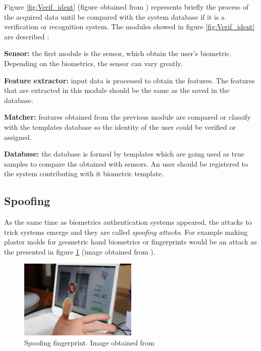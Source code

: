 Figure \ref{fig:Verif_ident} (figure obtained from \cite{Intro_biometrics2}) represents briefly the process of the acquired data until be compared  with the system database if it is a verification or recognition system. The modules showed in figure \ref{fig:Verif_ident} are described \cite{Intro_biometrics2}: 
\begin{description}[noitemsep,topsep=8pt,parsep=0pt,partopsep=20pt]
\item \textbf{Sensor:} the first module is the sensor, which obtain the user's biometric. Depending on the biometrics, the sensor can vary greatly.
\item \textbf{Feature extractor:} input data is processed to obtain the features. The features that are extracted in this module should be the same as the saved in the database.
\item \textbf{Matcher:} features obtained from the previous module are compared or classify with the templates database so the identity of the user could be verified or assigned.
\item \textbf{Database:} the database is formed by templates which are going used as true samples to compare the obtained with sensors. An user should be registered to the system contributing with it biometric template. 
\end{description}

\subsection{Spoofing}
As the same time as biometrics authentication systems appeared, the attacks to trick systems emerge and they are called \textit{spoofing attacks}. For example making plaster molds for geometric hand biometrics or fingerprints would be an attack as the presented in figure \ref{fig:Spoof_fingerprint} (image obtained from \cite{fingerprint_image}).\\

\begin{figure}[htb]
\centering
\includegraphics[width=0.5\textwidth]{images_miscelaneus/spoofing_fingerprint.jpg}
\caption{Spoofing fingerprint. Image obtained from \cite{fingerprint_image}} \label{fig:Spoof_fingerprint}
\end{figure}

